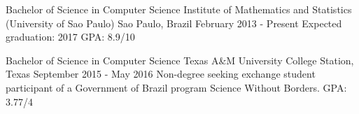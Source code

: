 \documentclass[11pt, a4paper]{awesome-cv-res}
\begin{document}
\makecvheader
\makecvfooter
  {}
  {}
  {\thepage}



\begin{cventries}
\cventry
{Bachelor of Science in Computer Science} %
{Institute of Mathematics and Statistics (University of Sao Paulo)} %
{Sao Paulo, Brazil} %
{February 2013 - Present} %
{Expected graduation: 2017 \newline GPA: 8.9/10}
\newline 
\newline

\cventry
{Bachelor of Science in Computer Science}
{Texas A\&M University}
{College Station, Texas}
{September 2015 - May 2016}
{Non-degree seeking exchange student participant of a Government of Brazil program Science Without Borders. \newline GPA: 3.77/4}
\end{cventries}
\end{document}
